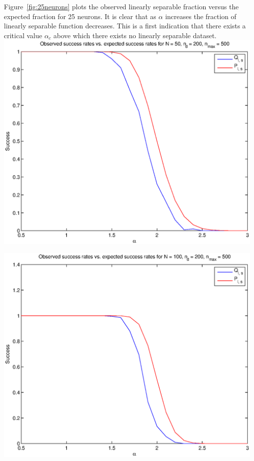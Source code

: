 Figure~\ref{fig:25neurons} plots the observed linearly separable fraction versus the expected fraction for 25 neurons. It is clear that as $\alpha$ increases the fraction of linearly separable function decreases. This is a first indication that there exists a critical value $\alpha_{c}$ above which there exists no linearly separable dataset.
\begingroup
    \centering
    \includegraphics[width=\linewidth]{success_rate_N_50_nd_200_nmax_500.eps}
    \label{fig:50neurons}
\endgroup


\begingroup
    \centering
    \includegraphics[width=\linewidth]{success_rate_N_100_nd_200_nmax_500.eps}
    \label{fig:100neurons}
\endgroup

